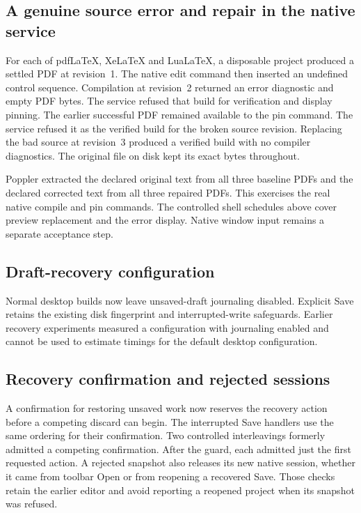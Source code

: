 \subsection{A genuine source error and repair in the native service}
For each of pdf\LaTeX{}, Xe\LaTeX{} and Lua\LaTeX{}, a disposable project
produced a settled PDF at revision~1. The native edit command then inserted
an undefined control sequence. Compilation at revision~2 returned an error
diagnostic and empty PDF bytes. The service refused that build for
verification and display pinning. The earlier successful PDF remained
available to the pin command. The service refused it as the verified build
for the broken source revision. Replacing
the bad source at revision~3 produced a verified build with no compiler
diagnostics. The original file on disk kept its exact bytes throughout.

Poppler extracted the declared original text from all three baseline PDFs
and the declared corrected text from all three repaired PDFs. This exercises
the real native compile and pin commands. The controlled shell schedules
above cover preview replacement and the error display. Native window input
remains a separate acceptance step.

\subsection{Draft-recovery configuration}
Normal desktop builds now leave unsaved-draft journaling disabled. Explicit
Save retains the existing disk fingerprint and interrupted-write safeguards.
Earlier recovery experiments measured a configuration with journaling enabled
and cannot be used to estimate timings for the default desktop configuration.

\subsection{Recovery confirmation and rejected sessions}
A confirmation for restoring unsaved work now reserves the recovery action
before a competing discard can begin. The interrupted Save handlers use the
same ordering for their confirmation. Two controlled interleavings formerly
admitted a competing confirmation. After the guard, each admitted just the
first requested action. A rejected snapshot also releases its new native
session, whether it came from toolbar Open or from reopening a recovered
Save. Those checks retain the earlier editor and avoid reporting a reopened
project when its snapshot was refused.

